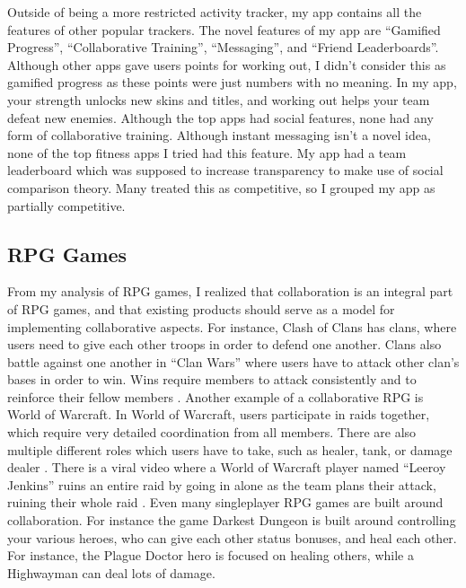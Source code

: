 \documentclass{l4proj}
\begin{document}
Outside of being a more restricted activity tracker, my app contains all the features of other popular trackers. 
The novel features of my app are ``Gamified Progress'', ``Collaborative Training'', ``Messaging'', and ``Friend Leaderboards''. Although other apps gave users points for working out, I didn't consider this as gamified progress as these points were just numbers with no meaning. In my app, your strength unlocks new skins and titles, and working out helps your team defeat new enemies. Although the top apps had social features, none had any form of collaborative training. Although instant messaging isn't a novel idea, none of the top fitness apps I tried had this feature. My app had a team leaderboard which was supposed to increase transparency to make use of social comparison theory. Many treated this as competitive, so I grouped my app as partially competitive.




\subsection{RPG Games}
From my analysis of RPG games, I realized that collaboration is an integral part of RPG games, and that existing products should serve as a model for implementing collaborative aspects. For instance, Clash of Clans has clans, where users need to give each other troops in order to defend one another. Clans also battle against one another in ``Clan Wars'' where users have to attack other clan's bases in order to win. Wins require members to attack consistently and to reinforce their fellow members \citep{coc}. 
Another example of a collaborative RPG is World of Warcraft. In World of Warcraft, users participate in raids together, which require very detailed coordination from all members. There are also multiple different roles which users have to take, such as healer, tank, or damage dealer \citep{wow}. There is a viral video where a World of Warcraft player named ``Leeroy Jenkins'' ruins an entire raid by going in alone as the team plans their attack, ruining their whole raid \citep{leeroy_jenkins}. Even many singleplayer RPG games are built around collaboration. For instance the game Darkest Dungeon \citep{darkest_dungeon} is built around controlling your various heroes, who can give each other status bonuses, and heal each other. For instance, the Plague Doctor hero is focused on healing others, while a Highwayman can deal lots of damage. 
\end{document}
